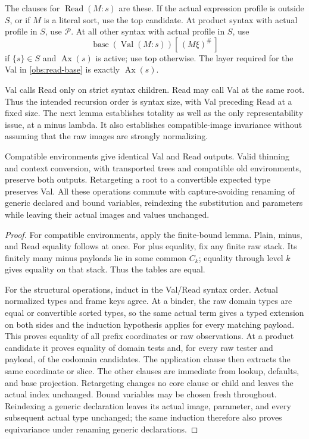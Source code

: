 The clauses for $\operatorname{Read}(M:s)$ are these.  If the actual
expression profile is outside $S$, or if $M$ is a literal sort, use the
top candidate.  At product syntax with actual profile in $S$, use
$\mathcal P$.  At all other syntax with actual profile in $S$, use
\begin{equation}\label{obs:read-base}
 \operatorname{base}(\operatorname{Val}(M:s))[\,(M\xi)^\#\,]
\end{equation}
if $\{s\}\in S$ and $\operatorname{Ax}(s)$ is active; use top otherwise.
The layer required for the Val in \eqref{obs:read-base} is exactly
$\operatorname{Ax}(s)$.

Val calls Read only on strict syntax children.  Read may call Val at
the same root.  Thus the intended recursion order is syntax size,
with Val preceding Read at a fixed size.  The next lemma establishes
totality as well as the only representability issue, at a minus lambda.
It also establishes compatible-image invariance without assuming that
the raw images are strongly normalizing.



\begin{lemma}\label{obs:structural-invariance}
Compatible environments give identical Val and Read outputs.  Valid
thinning and context conversion, with transported trees and compatible
old environments, preserve both outputs.  Retargeting a root to a
convertible expected type preserves Val.  All these operations commute with capture-avoiding renaming of generic
declared and bound variables, reindexing the substitution and parameters
while leaving their actual images and values unchanged.
\end{lemma}
\begin{proof}
For compatible environments, apply the finite-bound lemma.  Plain,
minus, and Read equality follows at once.  For plus equality, fix any
finite raw stack.  Its finitely many minus payloads lie in some common
$C_k$; equality through level $k$ gives equality on that stack.  Thus
the tables are equal.

For the structural operations, induct in the Val/Read syntax order.
Actual normalized types and frame keys agree.  At a binder, the raw
domain types are equal or convertible sorted types, so the same actual
term gives a typed extension on both sides and the induction hypothesis
applies for every matching payload.  This proves equality of all
prefix coordinates or raw observations.  At a product candidate it
proves equality of domain tests and, for every raw tester and payload,
of the codomain candidates.  The application clause then extracts the
same coordinate or slice.  The other clauses are immediate from lookup,
defaults, and base projection.  Retargeting changes no core clause or
child and leaves the actual index unchanged.  Bound variables may be chosen fresh throughout. Reindexing a generic
declaration leaves its actual image, parameter, and every subsequent actual
type unchanged; the same induction therefore also proves equivariance
under renaming generic declarations.
\end{proof}

